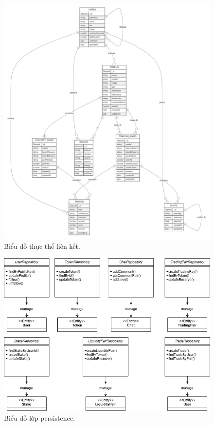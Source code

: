 \begin{figure}[H]
    \centering
    \includegraphics[width=1\textwidth]{figures/c2/DBdesign.png}
    \caption{Biểu đồ thực thể liên kết.}
    \label{fig:architecture-diagram}
\end{figure}

\begin{figure}[H]
    \centering
    \includegraphics[width=1\textwidth]{figures/c2/persistenceClass.png}
    \caption{Biểu đồ lớp persistence.}
    \label{fig:architecture-diagram}
\end{figure}

